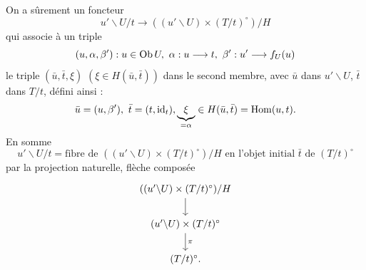  On a sûrement un foncteur
\[
u'\backslash U/t \longrightarrow ((u'\backslash U)\times(T/t)^{\circ})/H
\]
qui associe à un triple
\[
(u,\alpha,\beta') : u\in \mathrm{Ob}\, U,\ \alpha : u\longrightarrow t,\ \beta' : u'\longrightarrow f_U(u)
\]
le triple $(\bar u,\bar t,\xi)$ $(\xi\in H(\bar u,\bar t))$ dans le second membre, avec $\bar u$ dans $u'\backslash U$, $\bar t$ dans $T/t$, défini ainsi :
\[
\bar u = (u,\beta'),\ \bar t = (t,\mathrm{id}_t), \underbrace{\xi}_{=\alpha} \in H(\bar u,\bar t) = \mathrm{Hom}(u,t).
\]
En somme
\[
u'\backslash U/t = \text{fibre de } ((u'\backslash U)\times(T/t)^{\circ})/H \text{ en l'objet initial } \bar t \text{ de } (T/t)^{\circ}
\]
par la projection naturelle, flèche composée
\[
\begin{tikzcd}
((u'\backslash U)\times(T/t)^{\circ})/H \arrow[d] \\
(u'\backslash U)\times(T/t)^{\circ} \arrow[d, "\pi"] \\
(T/t)^{\circ}.
\end{tikzcd}
\]


